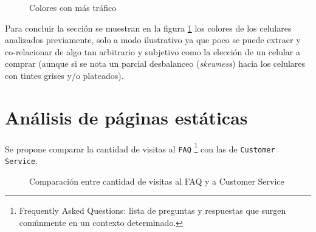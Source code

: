 \documentclass[a4paper]{article}
\begin{document}
\begin{figure}[h!]
	\caption{Colores con más tráfico}
	\label{fig:colores}
\end{figure}

Para concluir la sección se muestran en la figura \ref{fig:colores} los colores de los celulares analizados previamente, solo a modo ilustrativo ya que poco se puede extraer y co-relacionar de algo tan arbitrario y subjetivo como la elección de un celular a comprar (aunque si se nota un parcial desbalanceo (\textit{skewness}) hacia los celulares con tintes grises y/o plateados).

\section{Análisis de páginas estáticas}

Se propone comparar la cantidad de visitas al \texttt{FAQ} \footnote{Frequently Asked Questions: lista de preguntas y respuestas que surgen comúnmente en un contexto determinado.} con las de \texttt{Customer Service}.

\begin{figure}[h!]
	\caption{Comparación entre cantidad de visitas al FAQ y a Customer Service}
	\label{fig:staticpage}
\end{figure}
\end{document}
